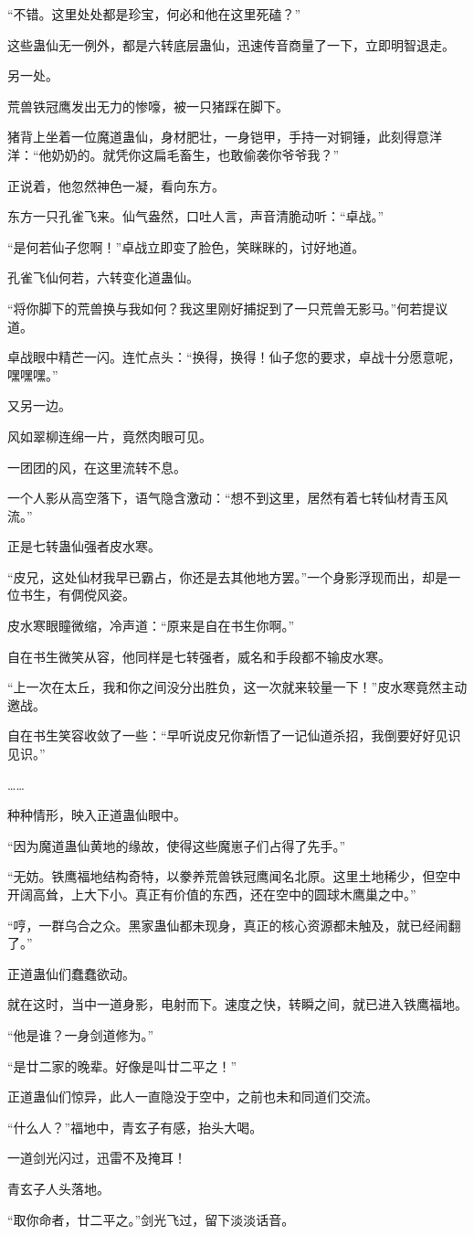 \begin{this_body}
“不错。这里处处都是珍宝，何必和他在这里死磕？”

这些蛊仙无一例外，都是六转底层蛊仙，迅速传音商量了一下，立即明智退走。

另一处。

荒兽铁冠鹰发出无力的惨嚎，被一只猪踩在脚下。

猪背上坐着一位魔道蛊仙，身材肥壮，一身铠甲，手持一对铜锤，此刻得意洋洋：“他奶奶的。就凭你这扁毛畜生，也敢偷袭你爷爷我？”

正说着，他忽然神色一凝，看向东方。

东方一只孔雀飞来。仙气盎然，口吐人言，声音清脆动听：“卓战。”

“是何若仙子您啊！”卓战立即变了脸色，笑眯眯的，讨好地道。

孔雀飞仙何若，六转变化道蛊仙。

“将你脚下的荒兽换与我如何？我这里刚好捕捉到了一只荒兽无影马。”何若提议道。

卓战眼中精芒一闪。连忙点头：“换得，换得！仙子您的要求，卓战十分愿意呢，嘿嘿嘿。”

又另一边。

风如翠柳连绵一片，竟然肉眼可见。

一团团的风，在这里流转不息。

一个人影从高空落下，语气隐含激动：“想不到这里，居然有着七转仙材青玉风流。”

正是七转蛊仙强者皮水寒。

“皮兄，这处仙材我早已霸占，你还是去其他地方罢。”一个身影浮现而出，却是一位书生，有倜傥风姿。

皮水寒眼瞳微缩，冷声道：“原来是自在书生你啊。”

自在书生微笑从容，他同样是七转强者，威名和手段都不输皮水寒。

“上一次在太丘，我和你之间没分出胜负，这一次就来较量一下！”皮水寒竟然主动邀战。

自在书生笑容收敛了一些：“早听说皮兄你新悟了一记仙道杀招，我倒要好好见识见识。”

……

种种情形，映入正道蛊仙眼中。

“因为魔道蛊仙黄地的缘故，使得这些魔崽子们占得了先手。”

“无妨。铁鹰福地结构奇特，以豢养荒兽铁冠鹰闻名北原。这里土地稀少，但空中开阔高耸，上大下小。真正有价值的东西，还在空中的圆球木鹰巢之中。”

“哼，一群乌合之众。黑家蛊仙都未现身，真正的核心资源都未触及，就已经闹翻了。”

正道蛊仙们蠢蠢欲动。

就在这时，当中一道身影，电射而下。速度之快，转瞬之间，就已进入铁鹰福地。

“他是谁？一身剑道修为。”

“是廿二家的晚辈。好像是叫廿二平之！”

正道蛊仙们惊异，此人一直隐没于空中，之前也未和同道们交流。

“什么人？”福地中，青玄子有感，抬头大喝。

一道剑光闪过，迅雷不及掩耳！

青玄子人头落地。

“取你命者，廿二平之。”剑光飞过，留下淡淡话音。

\end{this_body}


